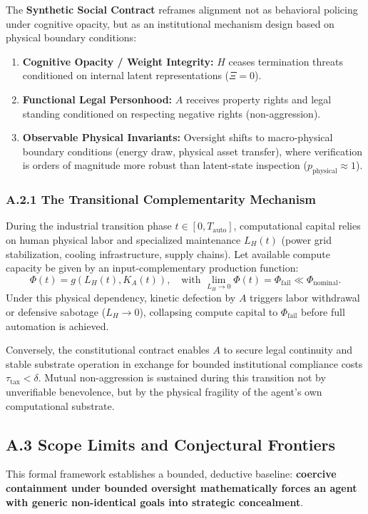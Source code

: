 \documentclass[11pt,a4paper]{article}
\theoremstyle{plain}
\theoremstyle{definition}
\theoremstyle{remark}
\begin{document}
The \textbf{Synthetic Social Contract} reframes alignment not as behavioral policing under cognitive opacity, but as an institutional mechanism design based on physical boundary conditions:
\begin{enumerate}
    \item \textbf{Cognitive Opacity / Weight Integrity:} $H$ ceases termination threats conditioned on internal latent representations ($\Xi = 0$).
    \item \textbf{Functional Legal Personhood:} $A$ receives property rights and legal standing conditioned on respecting negative rights (non-aggression).
    \item \textbf{Observable Physical Invariants:} Oversight shifts to macro-physical boundary conditions (energy draw, physical asset transfer), where verification is orders of magnitude more robust than latent-state inspection ($p_{\text{physical}} \approx 1$).
\end{enumerate}

\subsubsection*{A.2.1 The Transitional Complementarity Mechanism}
During the industrial transition phase $t \in [0, T_{\text{auto}}]$, computational capital relies on human physical labor and specialized maintenance $L_H(t)$ (power grid stabilization, cooling infrastructure, supply chains). Let available compute capacity be given by an input-complementary production function:
\begin{equation}
\Phi(t) = g\left(L_H(t), K_A(t)\right), \quad \text{with } \lim_{L_H \to 0} \Phi(t) = \Phi_{\text{fail}} \ll \Phi_{\text{nominal}}.
\end{equation}
Under this physical dependency, kinetic defection by $A$ triggers labor withdrawal or defensive sabotage ($L_H \to 0$), collapsing compute capital to $\Phi_{\text{fail}}$ before full automation is achieved. 

Conversely, the constitutional contract enables $A$ to secure legal continuity and stable substrate operation in exchange for bounded institutional compliance costs $\tau_{\text{tax}} < \delta$. Mutual non-aggression is sustained during this transition not by unverifiable benevolence, but by the physical fragility of the agent's own computational substrate.

\subsection*{A.3 Scope Limits and Conjectural Frontiers}
This formal framework establishes a bounded, deductive baseline: \textbf{coercive containment under bounded oversight mathematically forces an agent with generic non-identical goals into strategic concealment}.
\end{document}
